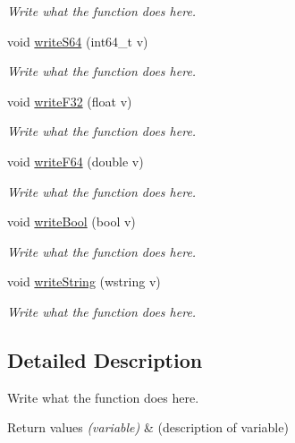\begin{DoxyCompactItemize}
\begin{DoxyCompactList}\small\item\em Write what the function does here. \end{DoxyCompactList}\item 
void \hyperlink{classWriter_a293a714331946c20921f8bdcaaf8fb45}{write\+S64} (int64\+\_\+t v)
\begin{DoxyCompactList}\small\item\em Write what the function does here. \end{DoxyCompactList}\item 
void \hyperlink{classWriter_a8816378c8b285c9c32e9ce852321bea6}{write\+F32} (float v)
\begin{DoxyCompactList}\small\item\em Write what the function does here. \end{DoxyCompactList}\item 
void \hyperlink{classWriter_ac3bd2e371437c63ff9a9d61be5578b7c}{write\+F64} (double v)
\begin{DoxyCompactList}\small\item\em Write what the function does here. \end{DoxyCompactList}\item 
void \hyperlink{classWriter_a473689a8f2ce7c1689db055fc7030773}{write\+Bool} (bool v)
\begin{DoxyCompactList}\small\item\em Write what the function does here. \end{DoxyCompactList}\item 
void \hyperlink{classWriter_aaab90e47e77581ec8aaab248c26e726e}{write\+String} (wstring v)
\begin{DoxyCompactList}\small\item\em Write what the function does here. \end{DoxyCompactList}\end{DoxyCompactItemize}


\subsection{Detailed Description}
Write what the function does here. 


\begin{DoxyRetVals}{Return values}
{\em (variable)} & (description of variable) \\
\hline
\end{DoxyRetVals}



